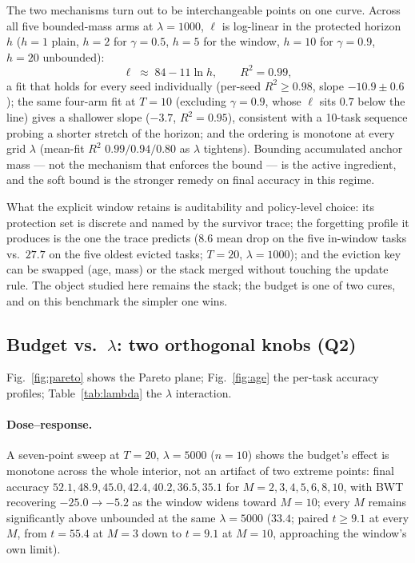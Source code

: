 \documentclass[review,12pt,number]{elsarticle}
\begin{document}
The two mechanisms turn out to be interchangeable points on one curve.
Across all five bounded-mass
arms at $\lambda{=}1000$, $\ell$ is log-linear in the protected
horizon $h$ ($h{=}1$ plain, $h{=}2$ for $\gamma{=}0.5$, $h{=}5$ for
the window, $h{=}10$ for $\gamma{=}0.9$, $h{=}20$ unbounded):
\begin{equation}
\label{eq:law}
\ell \;\approx\; 84 - 11\ln h, \qquad R^2 = 0.99,
\end{equation}
a fit that holds for
every seed individually (per-seed $R^2 \geq 0.98$, slope
$-10.9\pm0.6$); the same four-arm fit at $T{=}10$ (excluding
$\gamma{=}0.9$, whose $\ell$ sits $0.7$ below the line) gives a
shallower slope ($-3.7$, $R^2{=}0.95$), consistent with a 10-task
sequence probing a shorter stretch of the horizon; and the ordering is
monotone at every grid $\lambda$ (mean-fit $R^2$
$0.99/0.94/0.80$ as $\lambda$ tightens). Bounding accumulated anchor
mass --- not
the mechanism that enforces the bound --- is the active ingredient,
and the soft bound is the stronger remedy on final accuracy in this
regime.

What the explicit window retains is auditability and
policy-level choice: its protection set is discrete and named by the
survivor trace; the forgetting profile it produces is the one the
trace predicts ($8.6$ mean drop on the five in-window tasks vs.\ $27.7$
on the five oldest evicted tasks; $T{=}20$, $\lambda{=}1000$); and the
eviction key can be swapped (age, mass) or the stack
merged without touching the update rule. The object studied here
remains the stack; the budget is one of two cures, and on this
benchmark the simpler one wins.

\subsection{Budget vs.\ $\lambda$: two orthogonal knobs (Q2)}
\label{sec:exp-knobs}

Fig.~\ref{fig:pareto} shows the Pareto plane; Fig.~\ref{fig:age} the
per-task accuracy profiles; Table~\ref{tab:lambda} the $\lambda$
interaction.

\paragraph{Dose--response.}
A seven-point sweep at $T{=}20$, $\lambda{=}5000$ ($n{=}10$) shows the
budget's effect is monotone across the whole interior, not an artifact
of two extreme points: final accuracy $52.1, 48.9, 45.0, 42.4, 40.2,
36.5, 35.1$ for $M{=}2,3,4,5,6,8,10$, with BWT recovering
$-25.0 \to -5.2$ as the window widens toward $M{=}10$; every $M$
remains significantly above unbounded at the same
$\lambda{=}5000$ ($33.4$; paired $t\geq 9.1$ at every $M$,
from $t{=}55.4$ at $M{=}3$ down to $t{=}9.1$ at $M{=}10$, approaching
the window's own limit).
\end{document}
